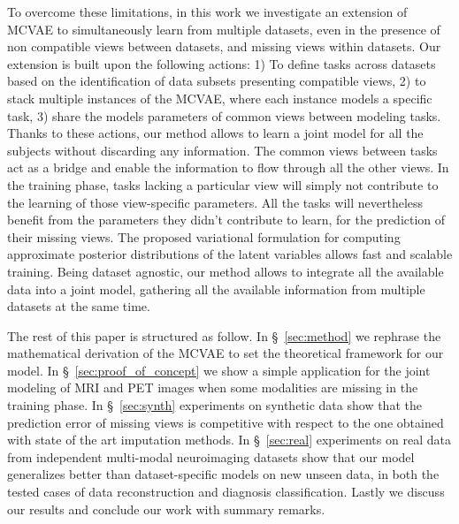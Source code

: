 To overcome these limitations, in this work we investigate an extension of MCVAE to simultaneously learn from multiple datasets, even in the presence of non compatible views between datasets, and missing views within datasets.
Our extension  is built upon the following actions:
1) To define tasks across datasets based on the identification of data subsets presenting compatible views,
2) to stack multiple instances of the MCVAE, where each instance models a specific task,
3) share the models parameters of common views between modeling tasks.
%
Thanks to these actions, our method allows to learn a joint model for all the subjects without discarding any information.
The common views between tasks act as a bridge and enable the information to flow through all the other views.
In the training phase, tasks lacking a particular view will simply not contribute to the learning of those view-specific parameters.
All the tasks will nevertheless benefit from the parameters they didn't contribute to learn, for the prediction of their missing views.
The proposed variational formulation for computing approximate posterior distributions of the latent variables allows fast and scalable training.
Being dataset agnostic, our method allows to integrate all the available data into a joint model, gathering  all the available information from multiple datasets at the same time.

The rest of this paper is structured as follow.
In \S~\ref{sec:method} we rephrase the mathematical derivation of the MCVAE to set the theoretical framework for our model.
In \S~\ref{sec:proof_of_concept} we show a simple application for the joint modeling of MRI and PET images when some modalities are missing in the training phase.
In \S~\ref{sec:synth} experiments on synthetic data show that the prediction error of missing views is competitive with respect to the one obtained with state of the art imputation methods.
In \S~\ref{sec:real} experiments on real data from independent multi-modal neuroimaging datasets show that our model generalizes better than dataset-specific models on new unseen data, in both the tested cases of data reconstruction and diagnosis classification.
Lastly we discuss our results and conclude our work with summary remarks.

